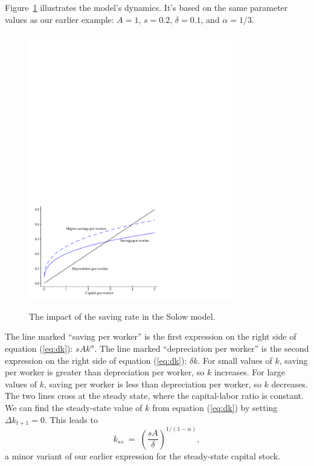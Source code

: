Figure~\ref{fig:solow2} illustrates the model's dynamics.
It's based on the same parameter values as our earlier example:
$ A = 1$, $s = 0.2$, $\delta = 0.1$, and $\alpha = 1/3$.
\begin{figure}[h]
\caption{The impact of the saving rate in the Solow model.}
    \label{fig:solow2}
    \centering
    \includegraphics[width=0.8\textwidth]{Figures/solow2.pdf}\\
\end{figure}
The line marked ``saving per worker'' is the first expression on
the right side of equation (\ref{eq:dk}):  $ s A k^\alpha $. The
line marked ``depreciation per worker'' is the second expression
on the right side of equation (\ref{eq:dk}):  $\delta k$. For
small values of $k$, saving per worker is greater than
depreciation per worker, so $k$ increases. For large values of
$k$, saving per worker is less than depreciation per worker, so
$k$ decreases. The two lines cross at the steady state, where the
capital-labor ratio is constant. We can find the steady-state
value of $k$ from equation (\ref{eq:dk}) by setting $\Delta
k_{t+1} = 0$.  This leads to
\[
    k_{ss} \;=\; \left( \frac{sA}{\delta} \right)^{1/(1-\alpha)} ,
\]
a minor variant of our earlier expression for the steady-state capital stock.


